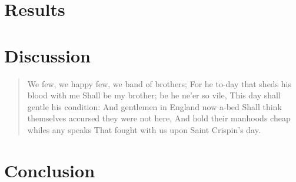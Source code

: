 \begin{remark}
\lipsum[1]
\end{remark}

\chapter{Results}

\lipsum
\chapter{Discussion}

\begin{quote}
We few, we happy few, we band of brothers;
For he to-day that sheds his blood with me
Shall be my brother; be he ne'er so vile,
This day shall gentle his condition:
And gentlemen in England now a-bed
Shall think themselves accursed they were not here,
And hold their manhoods cheap whiles any speaks
That fought with us upon Saint Crispin's day.
\end{quote}

\lipsum[2-4]

\chapter{Conclusion}

\lipsum

\backmatter
\printbibliography
\cleardoublepage
\listoftheorems[ignore={note,remark}]


